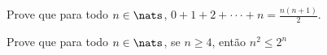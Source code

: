 \begin{exercise}
%
Prove que para todo $n \in\nats$, $0 + 1 + 2 + \cdot\cdot\cdot + n = \frac {n(n+1)} 2$.
\end{exercise}

\begin{exercise}
%
Prove que para todo $n \in\nats$, se  $n \geq 4$, então $n^2 \leq 2^n$
\end{exercise}

